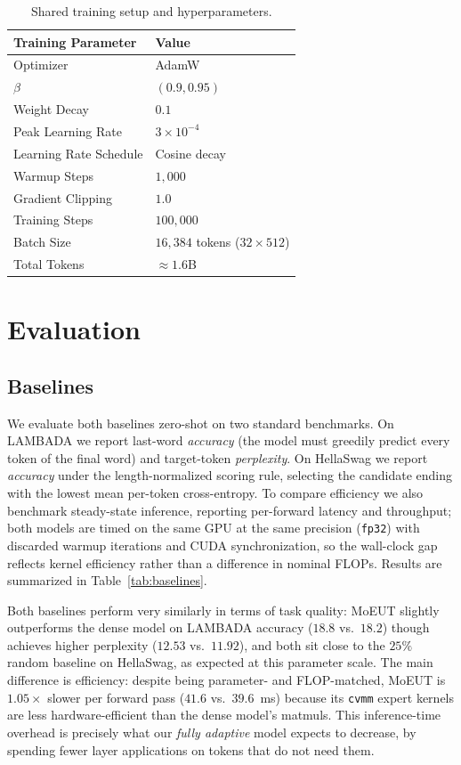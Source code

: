 \documentclass[11pt]{article}
\begin{document}
\begin{table}[htbp]
  \centering
  \small
  \begin{tabular}{ll}
    \toprule
    \textbf{Training Parameter} & \textbf{Value} \\
    \midrule
    Optimizer & AdamW \\
    $\beta$ & $(0.9, 0.95)$ \\
    Weight Decay & $0.1$ \\
    Peak Learning Rate & $3 \times 10^{-4}$ \\
    Learning Rate Schedule & Cosine decay \\
    Warmup Steps & $1{,}000$ \\
    Gradient Clipping & $1.0$ \\
    Training Steps & $100{,}000$ \\
    Batch Size & $16{,}384$ tokens ($32 \times 512$) \\
    Total Tokens & $\approx 1.6$B \\
    \bottomrule
  \end{tabular}
  \caption{Shared training setup and hyperparameters.}
  \label{tab:training_params}
\end{table}

\section{Evaluation}

\subsection{Baselines}
We evaluate both baselines zero-shot on two standard benchmarks. On LAMBADA
\citep{lambada} we report last-word \emph{accuracy} (the model must
greedily predict every token of the final word) and target-token
\emph{perplexity}. On HellaSwag \citep{hellaswag} we report
\emph{accuracy} under the length-normalized scoring rule, selecting the candidate
ending with the lowest mean per-token cross-entropy. To compare efficiency we
also benchmark steady-state inference, reporting per-forward latency and
throughput; both models are timed on the same GPU at the same precision
(\texttt{fp32}) with discarded warmup iterations and CUDA synchronization, so the
wall-clock gap reflects kernel efficiency rather than a difference in nominal
FLOPs. Results are summarized in Table~\ref{tab:baselines}.

Both baselines perform very similarly in terms of task quality: MoEUT slightly outperforms the
dense model on LAMBADA accuracy ($18.8$ vs.\ $18.2$) though achieves higher
perplexity ($12.53$ vs.\ $11.92$), and both sit close to the $25\%$ random
baseline on HellaSwag, as expected at this parameter scale. The main
difference is efficiency: despite being parameter- and FLOP-matched, MoEUT is
$1.05\times$ slower per forward pass ($41.6$ vs.\ $39.6$~ms) because its
\texttt{cvmm} expert kernels are less hardware-efficient than the dense model's
matmuls. This inference-time overhead is precisely what our \emph{fully adaptive} model
expects to decrease, by spending fewer layer applications on tokens that do not need them.
\end{document}
